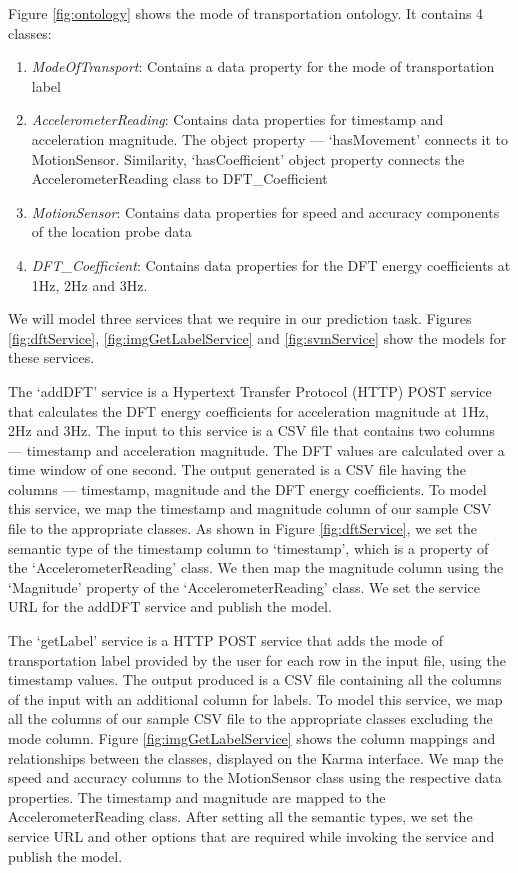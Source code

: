 Figure \ref{fig:ontology} shows the mode of transportation ontology. It contains 4 classes:
\begin{enumerate}
  \item \textit{ModeOfTransport}: Contains a data property for the mode of transportation label
  \item \textit{AccelerometerReading}: Contains data properties for timestamp and acceleration magnitude. The object property --- `hasMovement' connects it to MotionSensor. Similarity, `hasCoefficient' object property connects the AccelerometerReading class to DFT\_Coefficient
  \item \textit{MotionSensor}: Contains data properties for speed and accuracy components of the location probe data
  \item \textit{DFT\_Coefficient}: Contains data properties for the DFT energy coefficients at 1Hz, 2Hz and 3Hz.
\end{enumerate} 

We will model three services that we require in our prediction task. Figures \ref{fig:dftService}, \ref{fig:imgGetLabelService} and \ref{fig:svmService} show the models for these services.

The `addDFT' service is a Hypertext Transfer Protocol (HTTP) POST service that calculates the DFT energy coefficients for acceleration magnitude at 1Hz, 2Hz and 3Hz. The input to this service is a CSV file that contains two columns --- timestamp and acceleration magnitude. The DFT values are calculated over a time window of one second. The output generated is a CSV file having the columns --- timestamp, magnitude and the DFT energy coefficients. To model this service, we map the timestamp and magnitude column of our sample CSV file to the appropriate classes. As shown in Figure \ref{fig:dftService}, we set the semantic type of the timestamp column to `timestamp', which is a property of the `AccelerometerReading' class. We then map the magnitude column using the `Magnitude' property of the `AccelerometerReading' class. We set the service URL for the addDFT service and publish the model.

The `getLabel' service is a HTTP POST service that adds the mode of transportation label provided by the user for each row in the input file, using the timestamp values. The output produced is a CSV file containing all the columns of the input with an additional column for labels. To model this service, we map all the columns of our sample CSV file to the appropriate classes excluding the mode column. Figure \ref{fig:imgGetLabelService} shows the column mappings and relationships between the classes, displayed on the Karma interface. We map the speed and accuracy columns to the MotionSensor class using the respective data properties. The timestamp and magnitude are mapped to the AccelerometerReading class. After setting all the semantic types, we set the service URL and other options that are required while invoking the service and publish the model. 

